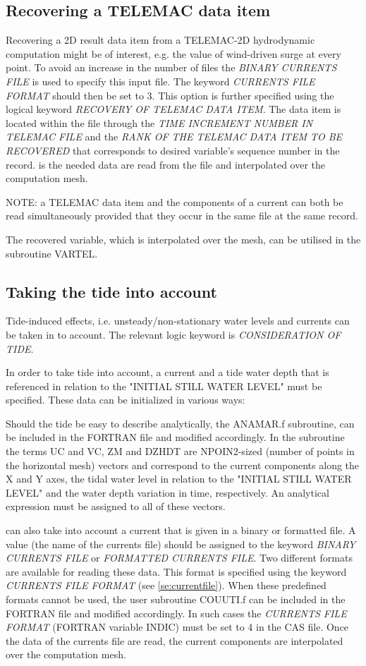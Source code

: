 \subsection{ Recovering a TELEMAC data item}
\label{se:telemacdata}
 Recovering a 2D result data item from a TELEMAC-2D hydrodynamic computation might be of interest, e.g. the value of wind-driven surge at every point. To avoid an increase in the number of files the \textit{BINARY CURRENTS FILE} is used to specify this input file. The keyword \textit{CURRENTS FILE FORMAT} should then be set to 3. This option is further specified using the logical keyword \textit{RECOVERY OF TELEMAC DATA ITEM}. The data item is located within the file through the \textit{TIME INCREMENT NUMBER IN TELEMAC FILE} and the \textit{RANK OF THE TELEMAC DATA ITEM TO BE RECOVERED} that corresponds to desired variable's sequence number in the record. is the needed data are read from the file and interpolated over the computation mesh.

 NOTE: a TELEMAC data item and the components of a current can both be read simultaneously provided that they occur in the same file at the same record.

 The recovered variable, which is interpolated over the mesh, can be utilised in the subroutine VARTEL.


\subsection{ Taking the tide into account}
\label{se:tide}
 Tide-induced effects, i.e. unsteady/non-stationary water levels and currents can be taken in to account. The relevant logic keyword is \textit{CONSIDERATION OF TIDE}.

 In order to take tide into account, a current and a tide water depth that is referenced in relation to the "INITIAL STILL WATER LEVEL" must be specified. These data can be initialized in various ways:

 Should the tide be easy to describe analytically, the ANAMAR.f subroutine, can be included in the FORTRAN file and modified accordingly. In the subroutine the terms UC and VC, ZM and DZHDT are NPOIN2-sized (number of points in the horizontal mesh) vectors and correspond to the current components along the X and Y axes, the tidal water level in relation to the "INITIAL STILL WATER LEVEL" and the water depth variation in time, respectively. An analytical expression must be assigned to all of these vectors.

 \tomawac can also take into account a current that is given in a binary or formatted file. A value (the name of the currents file) should be assigned to the keyword \textit{BINARY CURRENTS FILE} or\textit{ FORMATTED CURRENTS FILE}. Two different formats are available for reading these data. This format is specified using the keyword \textit{CURRENTS FILE FORMAT} (see \ref{se:currentfile}). When these predefined formats cannot be used, the user subroutine COUUTI.f can be included in the FORTRAN file and modified accordingly. In such cases the \textit{CURRENTS FILE FORMAT} (FORTRAN variable INDIC) must be set to 4 in the CAS file. Once the data of the currents file are read, the current components are interpolated over the computation mesh.

